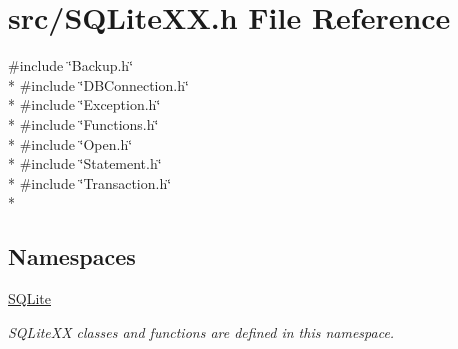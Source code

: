\hypertarget{a00030}{\section{src/\-S\-Q\-Lite\-X\-X.h File Reference}
\label{a00030}
}
{\ttfamily \#include \char`\"{}Backup.\-h\char`\"{}}\\*
{\ttfamily \#include \char`\"{}D\-B\-Connection.\-h\char`\"{}}\\*
{\ttfamily \#include \char`\"{}Exception.\-h\char`\"{}}\\*
{\ttfamily \#include \char`\"{}Functions.\-h\char`\"{}}\\*
{\ttfamily \#include \char`\"{}Open.\-h\char`\"{}}\\*
{\ttfamily \#include \char`\"{}Statement.\-h\char`\"{}}\\*
{\ttfamily \#include \char`\"{}Transaction.\-h\char`\"{}}\\*
\subsection*{Namespaces}
\begin{DoxyCompactItemize}
\item 
\hyperlink{a00038}{S\-Q\-Lite}
\begin{DoxyCompactList}\small\item\em S\-Q\-Lite\-X\-X classes and functions are defined in this namespace. \end{DoxyCompactList}\end{DoxyCompactItemize}
